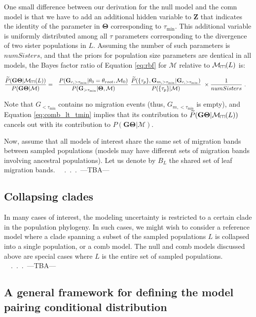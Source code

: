\documentclass[11pt]{article}
\newcommand{\vect}[1]{\boldsymbol{\mathbf{#1}}}
\newcommand{\M}{\mathcal{M}}
\newcommand{\G}{\vect{G}}
\newcommand{\T}{\vect{\Theta}}
\newcommand{\GT}{\G\T}
\newcommand{\Pref}{\widetilde{P}}
\newcommand{\Z}{\vect{Z}}
\newcommand{\troot}{\theta_{root}}
\def\comb{\rotatebox[origin=c]{90}{$\exists$}}
\newcommand{\Mcomb}{\M_{\comb}}
\newcommand{\tmin}{\tau_{\text{min}}}
\begin{document}
One small difference between our derivation for the null model and the comn model is that we have to add an additional hidden variable to $\Z$ that
indicates the identity of the parameter in $\T$ corresponding to $\tmin$.
This additional variable is uniformly distributed among all $\tau$ parameters corresponding to the divergence of two sister populations
in $L$. Assuming the number of such parameters is $numSisters$, and that the priors for population size parameters are dentical
in all models, the Bayes factor ratio of Equation \ref{eq:rbf} for $\M$ relative to $\Mcomb(L)$ is:
%
%
\begin{small}
\begin{align}
\frac{\Pref(\GT|\Mcomb(L)) }{P(\GT|\M)}
&=~~ %
     \frac{ P(\G_{c,>\tmin}|\theta_0=\troot,\M_0) }{ P(\G_{>\tmin}|\T,\M)} ~
     \frac{ \Pref(\{\tau_p\},\G_{m,>\tmin}|\G_{c,>\tmin})}{P(\{\tau_p\}|\M)} ~
     \times \frac{1}{numSisters}~. \label{eq:rbf_comb_nomig}
\end{align}
\end{small}

Note that $G_{<\tmin}$ contains no migration events (thus, $G_{m,<\tmin}$ is empty), and Equation \ref{eq:comb_lt_tmin}
implies that its contribution to $\Pref(\GT|\Mcomb(L))$ cancels out with its contribution to $P(\GT|\M)$.


Now, assume that all models of interest share the same set of migration bands between sampled populations
(models may have different sets of migration bands involving ancestral populations).
%
Let us denote by $B_L$ the shared set of leaf migration bands.
%
~~.\ .\ .\ ---TBA---

\subsection*{Collapsing clades}

In many cases of interest, the modeling uncertainty is restricted to a certain clade in the population phylogeny.
%
In such cases, we might wish to consider a reference model where a clade spanning a subset of the sampled populations $L$
is collapsed into a single population, or a comb model. The null and comb models discussed above are special cases where
$L$ is the entire set of sampled populations.
%
~~.\ .\ .\ ---TBA---

\subsection*{A general framework for defining the model pairing conditional distribution}
\end{document}
